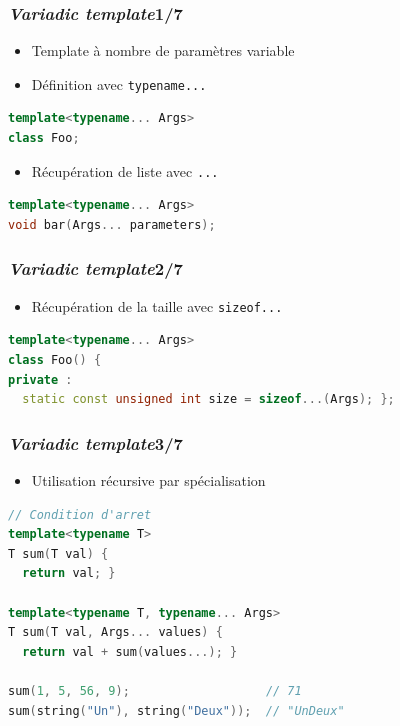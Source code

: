 \documentclass[C++.tex]{subfiles}
\begin{document}
\begin{frame}[fragile]
	\frametitle{\textit{Variadic template}\titlehfill{}1/7}
	\begin{itemize}
		\item Template à nombre de paramètres variable
		\item Définition avec \lstinline|typename...|
	\end{itemize}

	\begin{lstlisting}[language=C++]
template<typename... Args>
class Foo;\end{lstlisting}

	\begin{itemize}
		\item Récupération de liste avec \lstinline|...|
	\end{itemize}

	\begin{lstlisting}[language=C++]
template<typename... Args>
void bar(Args... parameters);\end{lstlisting}
\end{frame}

\begin{frame}[fragile]
	\frametitle{\textit{Variadic template}\titlehfill{}2/7}
	\begin{itemize}
		\item Récupération de la taille avec \lstinline|sizeof...|
	\end{itemize}

	\begin{lstlisting}[language=C++]
template<typename... Args>
class Foo() {
private :
  static const unsigned int size = sizeof...(Args); };\end{lstlisting}
\end{frame}

\begin{frame}[fragile]
	\frametitle{\textit{Variadic template}\titlehfill{}3/7}
	\begin{itemize}
		\item Utilisation récursive par spécialisation
	\end{itemize}

	\begin{lstlisting}[language=C++]
// Condition d'arret
template<typename T>
T sum(T val) {
  return val; }

template<typename T, typename... Args>
T sum(T val, Args... values) {
  return val + sum(values...); }

sum(1, 5, 56, 9);                   // 71
sum(string("Un"), string("Deux"));  // "UnDeux"\end{lstlisting}

\end{frame}
\end{document}
